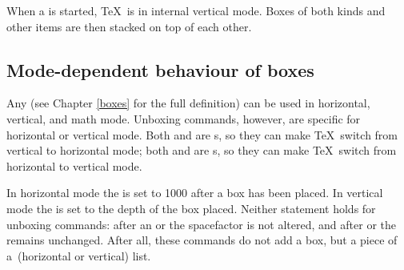 \documentclass{book}
\begin{document}
When a  is started, \TeX\ is in internal vertical mode.
Boxes of both kinds and other items are then stacked
on top of each other.


\subsection{Mode-dependent behaviour of boxes}

Any  (see Chapter \ref{boxes} for the full definition)
can be used in horizontal, vertical, and math mode.
Unboxing commands, however, are specific for horizontal or vertical mode.
Both  and  are s,
so they can make \TeX\ switch from vertical to horizontal
mode; 
both  and  are s,
so they can make \TeX\ switch from horizontal to vertical
mode.

In horizontal mode the  is set to 1000
after a box has been placed. In vertical mode the
 is set to the depth of the box placed.
Neither statement holds for
unboxing commands: after an  or  the 
spacefactor is not altered, and after  or 
the  remains unchanged.
After all, these commands do not add a box,
but a piece of a~(horizontal or vertical) list.
\end{document}
